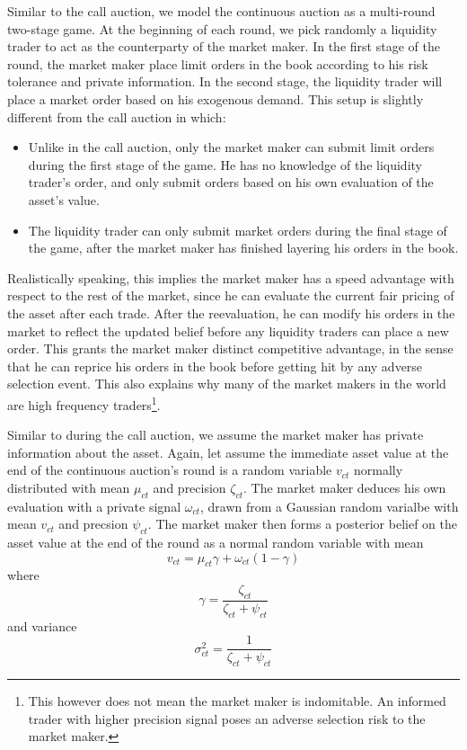 \documentclass{article}
\begin{document}
Similar to the call auction, we model the continuous auction as a multi-round two-stage game. At the beginning of each round, we pick randomly a liquidity trader to act as the counterparty of the market maker. In the first stage of the round, the market maker place limit orders in the book according to his risk tolerance and private information. In the second stage, the liquidity trader will place a market order based on his exogenous demand. This setup is slightly different from the call auction in which:
\begin{itemize}
  \item Unlike in the call auction, only the market maker can submit limit orders during the first stage of the game. He has no knowledge of the liquidity trader's order, and only submit orders based on his own evaluation of the asset's value.
  \item The liquidity trader can only submit market orders during the final stage of the game, after the market maker has finished layering his orders in the book.
\end{itemize}
Realistically speaking, this implies the market maker has a speed advantage with respect to the rest of the market, since he can evaluate the current fair pricing of the asset after each trade. After the reevaluation, he can modify his orders in the market to reflect the updated belief before any liquidity traders can place a new order. This grants the market maker distinct competitive advantage, in the sense that he can reprice his orders in the book before getting hit by any adverse selection event. This also explains why many of the market makers in the world are high frequency traders\footnote{This however does not mean the market maker is indomitable. An informed trader with higher precision signal poses an adverse selection risk to the market maker.}.

Similar to during the call auction, we assume the market maker has private information about the asset. Again, let assume the immediate asset value at the end of the continuous auction's round is a random variable $v_{ct}$ normally distributed with mean $\mu_{ct}$ and precision $\zeta_{ct}$. The market maker deduces his own evaluation with a private signal $\omega_{ct}$, drawn from a Gaussian random varialbe with mean $v_{ct}$ and precsion $\psi_{ct}$. The market maker then forms a posterior belief on the asset value at the end of the round as a normal random variable with mean
\[
  v_{ct}=\mu_{ct} \gamma + \omega_{ct}(1 - \gamma)
\]
where
\[
  \gamma = \frac{\zeta_{ct}}{\zeta_{ct}+\psi_{ct}}
\]
and variance
\[
  \sigma_{ct}^2=\frac{1}{\zeta_{ct}+\psi_{ct}}
\]
\end{document}
